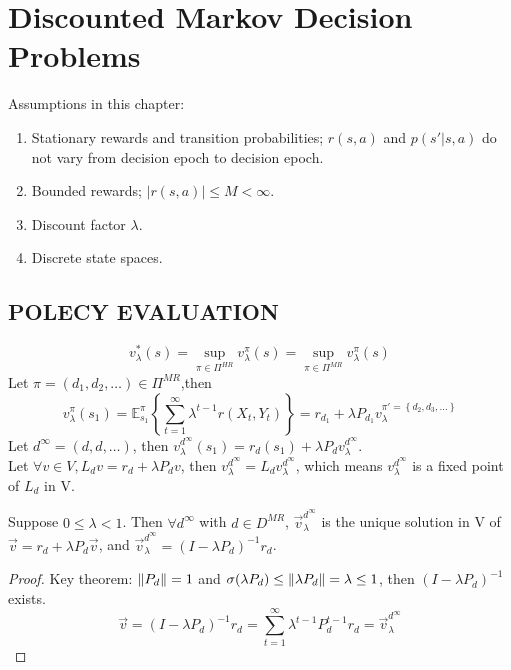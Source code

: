 
\section{Discounted Markov Decision Problems}%
\label{sec:discounted_markov_decision_problems}

Assumptions in this chapter:
\begin{enumerate}
    \item Stationary rewards and transition probabilities; $ r(s, a) $ and $ p(s' | s, a) $ do not vary from decision epoch to decision epoch.
    \item Bounded rewards; $ \left| r(s, a) \right| \le M < \infty $.
    \item Discount factor $ \lambda $.
    \item Discrete state spaces.
\end{enumerate}

\subsection{POLECY EVALUATION}%
\label{sub:polecy_evaluation}

\[
    v^*_\lambda(s) = \sup_{\pi \in \Pi^{HR}} v^\pi_\lambda(s) = \sup_{\pi \in \Pi^{MR}} v^\pi_\lambda(s)
\]
Let $ \pi = (d_1, d_2, \ldots) \in \Pi^{MR} $,then 
\[
    v^\pi_\lambda(s_1) = \mathbb{E}^\pi_{s_1} \left\{ \sum^{\infty}_{t=1} \lambda^{t-1} r(X_t, Y_t) \right\}
    = r_{d_1} + \lambda P_{d_1} v^{\pi' = \left\{ d_2, d_3, \ldots \right\}}_\lambda
\]
Let $ d^\infty = (d, d, \ldots) $, then $ v^{d^\infty}_\lambda(s_1) = r_d(s_1) + \lambda P_d v^{d^\infty}_\lambda $. \\
Let $ \forall v \in V, L_d v = r_d + \lambda P_d v $, then $ v^{d^\infty}_\lambda = L_d v^{d^\infty}_\lambda $, which means $ v^{d^\infty}_\lambda $ is a fixed point of $ L_d $ in V.

\begin{theorem}
Suppose $ 0 \le \lambda < 1 $. Then $ \forall d^\infty $ with $ d \in D^{MR} $, $ \vec v^{d^\infty}_\lambda $ is the unique solution in V of $ \vec v = r_d + \lambda P_d \vec v $, and $ \vec v^{d^\infty}_\lambda = {(I - \lambda P_d)}^{-1} r_d $.
    \begin{proof}
        Key theorem:
    $ \Arrowvert P_d \Arrowvert = 1 $ and $ \sigma (\lambda P_d) \le \Arrowvert \lambda P_d \Arrowvert = \lambda \le 1$, then $ {(I - \lambda P_d)}^{-1} $ exists.
        \[
            \vec v = {(I - \lambda P_d)}^{-1} r_d = \sum^{\infty}_{t=1} \lambda^{t-1} P^{t-1}_d r_d = \vec v^{d^\infty}_\lambda
        \]
    \end{proof}
\end{theorem}

